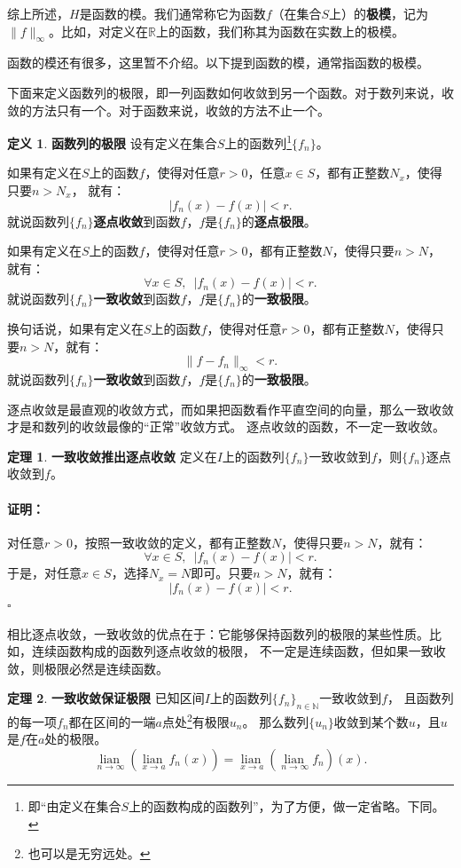 \documentclass[12pt,UTF8]{ctexbook}
\newcommand{\lian}[1]{
    \underset{#1}{\operatorname{lian}\,}
}
\theoremstyle{definition}
\newtheorem{df}{定义}[section]
\newtheorem{tm}{定理}[section]
\theoremstyle{plain}
\renewenvironment{proof}{\paragraph{\textbf{证明：}}}{\hfill$\square$}
\begin{document}
\begin{appendix}
综上所述，$H$是函数的模。我们通常称它为函数$f$（在集合$S$上）的\textbf{极模}，记为$\|f\|_{\infty}$。比如，对定义在$\mathbb{R}$上的函数，我们称其为函数在实数上的极模。

函数的模还有很多，这里暂不介绍。以下提到函数的模，通常指函数的极模。

下面来定义函数列的极限，即一列函数如何收敛到另一个函数。对于数列来说，收敛的方法只有一个。对于函数来说，收敛的方法不止一个。

\begin{df}{\textbf{函数列的极限}}
    设有定义在集合$S$上的函数列\footnote{即“由定义在集合$S$上的函数构成的函数列”，为了方便，做一定省略。下同。}$\{f_n\}$。
    
    如果有定义在$S$上的函数$f$，使得对任意$r>0$，任意$x\in S$，都有正整数$N_x$，使得只要$n>N_x$，
    就有：
    $$ |f_n(x) - f(x) | < r.$$
    就说函数列$\{f_n\}$\textbf{逐点收敛}到函数$f$，$f$是$\{f_n\}$的\textbf{逐点极限}。

    如果有定义在$S$上的函数$f$，使得对任意$r>0$，都有正整数$N$，使得只要$n>N$，
    就有：
    $$ \forall x\in S, \,\,\,|f_n(x) - f(x) | < r.$$
    就说函数列$\{f_n\}$\textbf{一致收敛}到函数$f$，$f$是$\{f_n\}$的\textbf{一致极限}。

    换句话说，如果有定义在$S$上的函数$f$，使得对任意$r>0$，都有正整数$N$，使得只要$n>N$，就有：
    $$ \| f - f_n \|_{\infty} < r.$$
    就说函数列$\{f_n\}$\textbf{一致收敛}到函数$f$，$f$是$\{f_n\}$的\textbf{一致极限}。
\end{df}

逐点收敛是最直观的收敛方式，而如果把函数看作平直空间的向量，那么一致收敛才是和数列的收敛最像的“正常”收敛方式。
逐点收敛的函数，不一定一致收敛。

\begin{tm}{\textbf{一致收敛推出逐点收敛}}
    定义在$I$上的函数列$\{f_n\}$一致收敛到$f$，则$\{f_n\}$逐点收敛到$f$。
\end{tm}

\begin{proof}
    对任意$r>0$，按照一致收敛的定义，都有正整数$N$，使得只要$n>N$，就有：
    $$ \forall x\in S, \,\,\,|f_n(x) - f(x) | < r.$$
    于是，对任意$x\in S$，选择$N_x = N$即可。只要$n>N$，就有：
    $$ |f_n(x) - f(x) | < r.$$
\end{proof}

相比逐点收敛，一致收敛的优点在于：它能够保持函数列的极限的某些性质。比如，连续函数构成的函数列逐点收敛的极限，
不一定是连续函数，但如果一致收敛，则极限必然是连续函数。

\begin{tm}{\textbf{一致收敛保证极限}}
    已知区间$I$上的函数列$\{f_n\}_{n\in\mathbb{N}}$一致收敛到$f$，
    且函数列的每一项$f_n$都在区间的一端$a$点处\footnote{也可以是无穷远处。}有极限$u_n$。
    那么数列$\{u_n\}$收敛到某个数$u$，且$u$是$f$在$a$处的极限。
    $$ \lian{n\to \infty} \left(\lian{x\to a} f_n(x) \right) = \lian{x\to a} \left(\lian{n\to \infty} f_n\right)(x). $$
\end{tm}


\end{appendix}
\end{document}
